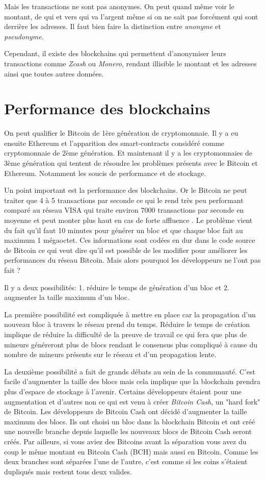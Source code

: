 Mais les transactions ne sont pas anonymes. On peut quand même voir le montant, de qui et vers qui va l'argent même si on ne sait pas forcément qui sont derrière les adresses. Il faut bien faire la distinction entre \emph{anonyme} et \emph{pseudonyme}.

Cependant, il existe des blockchains qui permettent d'anonymiser leurs transactions comme \emph{Zcash} ou \emph{Monero}, rendant illisible le montant et les adresses ainsi que toutes autres données.

\newpage

\section{Performance des blockchains}

On peut qualifier le Bitcoin de 1ère génération de cryptomonnaie. Il y a eu ensuite Ethereum et l'apparition des smart-contracts considéré comme cryptomonnaie de 2ème génération. Et maintenant il y a les cryptomonnaies de 3ème génération qui tentent de résoudre les problèmes présents avec le Bitcoin et Ethereum. Notamment les soucis de performance et de stockage.

Un point important est la performance des blockchains. Or le Bitcoin ne peut traiter que 4 à 5 transactions par seconde ce qui le rend très peu performant comparé au réseau VISA qui traite environ 7000 transactions par seconde en moyenne et peut monter plus haut en cas de forte affluence \cite{bitcoin-visa}. Le problème vient du fait qu'il faut 10 minutes pour générer un bloc et que chaque bloc fait au maximum 1 mégaoctet. Ces informations sont codées en dur dans le code source de Bitcoin ce qui veut dire qu'il est possible de les modifier pour améliorer les performances du réseau Bitcoin. Mais alors pourquoi les développeurs ne l'ont pas fait ? 

Il y a deux possibilités: 1. réduire le temps de génération d'un bloc et 2. augmenter la taille maximum d'un bloc. 

La première possibilité est compliquée à mettre en place car la propagation d'un nouveau bloc à travers le réseau prend du temps. Réduire le temps de création implique de réduire la difficulté de la preuve de travail ce qui fera que plus de mineurs généreront plus de blocs rendant le consensus plus compliqué à cause du nombre de mineurs présents sur le réseau et d'un propagation lente.

La deuxième possibilité a fait de grands débats au sein de la communauté. C'est facile d'augmenter la taille des blocs mais cela implique que la blockchain prendra plus d'espace de stockage à l'avenir. Certains développeurs étaient pour une augmentation et d'autres non ce qui est venu à créer \emph{Bitcoin Cash}, un "hard fork" de Bitcoin. Les développeurs de Bitcoin Cash ont décidé d'augmenter la taille maximum des blocs. Ils ont choisi un bloc dans la blockchain Bitcoin et ont créé une nouvelle branche depuis laquelle les nouveaux blocs de Bitcoin Cash seront créés. Par ailleurs, si vous aviez des Bitcoins avant la séparation vous avez du coup le même montant en Bitcoin Cash (BCH) mais aussi en Bitcoin. Comme les deux branches sont séparées l'une de l'autre, c'est comme si les coins s'étaient dupliqués mais restent tous deux valides.